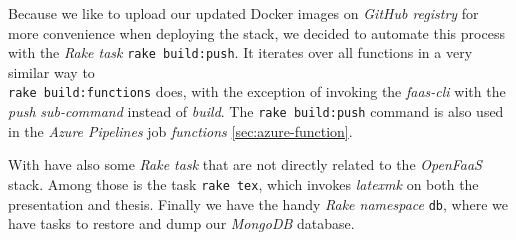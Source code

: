 Because we like to upload our updated Docker images on \textit{GitHub registry} for more convenience
when deploying the stack, we decided to automate this process with the \textit{Rake task}
\lstinline{rake build:push}. It iterates over all functions in a very similar way to \\
\lstinline{rake build:functions} does, with the exception of invoking the \textit{faas-cli} with the
\textit{push} \textit{sub-command} instead of \textit{build}. The \lstinline{rake build:push}
command is also used in the \textit{Azure Pipelines} job \textit{functions}
\autoref{sec:azure-function}.

With have also some \textit{Rake task} that are not directly related to the \textit{OpenFaaS} stack.
Among those is the task \lstinline{rake tex}, which invokes \textit{latexmk} on both the
presentation and thesis. Finally we have the handy \textit{Rake namespace} \lstinline{db}, where we
have tasks to restore and dump our \textit{MongoDB} database.

